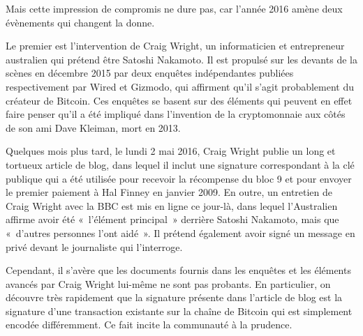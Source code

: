 Mais cette impression de compromis ne dure pas, car l'année 2016 amène deux évènements qui changent la donne.

Le premier est l'intervention de Craig Wright, un informaticien et entrepreneur australien qui prétend être Satoshi Nakamoto. Il est propulsé sur les devants de la scènes en décembre 2015 par deux enquêtes indépendantes publiées respectivement par Wired et Gizmodo, qui affirment qu'il s'agit probablement du créateur de Bitcoin. Ces enquêtes se basent sur des éléments qui peuvent en effet faire penser qu'il a été impliqué dans l'invention de la cryptomonnaie aux côtés de son ami Dave Kleiman, mort en 2013.

Quelques mois plus tard, le lundi 2 mai 2016, Craig Wright publie un long et tortueux article de blog, dans lequel il inclut une signature correspondant à la clé publique qui a été utilisée pour recevoir la récompense du bloc 9 et pour envoyer le premier paiement à Hal Finney en janvier 2009. En outre, un entretien de Craig Wright avec la BBC est mis en ligne ce jour-là, dans lequel l'Australien affirme avoir été «~l'élément principal~» derrière Satoshi Nakamoto, mais que «~d'autres personnes l'ont aidé~». Il prétend également avoir signé un message en privé devant le journaliste qui l'interroge.

Cependant, il s'avère que les documents fournis dans les enquêtes et les éléments avancés par Craig Wright lui-même ne sont pas probants. En particulier, on découvre très rapidement que la signature présente dans l'article de blog est la signature d'une transaction existante sur la chaîne de Bitcoin qui est simplement encodée différemment. Ce fait incite la communauté à la prudence.

